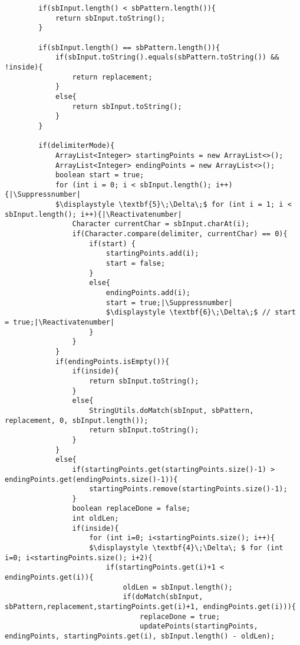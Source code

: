 \documentclass{article}
\makeatletter
\let\origthelstnumber\thelstnumber
\newcommand*\Suppressnumber{%
  \lst@AddToHook{OnNewLine}{%
    \let\thelstnumber\relax%
     \advance\c@lstnumber-\@ne\relax%
    }%
}
\newcommand*\Reactivatenumber{%
  \lst@AddToHook{OnNewLine}{%
   \let\thelstnumber\origthelstnumber%
   \advance\c@lstnumber\@ne\relax}%
}
\makeatother
\begin{document}
\begin{lstlisting}
        if(sbInput.length() < sbPattern.length()){
            return sbInput.toString();
        }

        if(sbInput.length() == sbPattern.length()){
            if(sbInput.toString().equals(sbPattern.toString()) && !inside){
                return replacement;
            }
            else{
                return sbInput.toString();
            }
        }

        if(delimiterMode){
            ArrayList<Integer> startingPoints = new ArrayList<>();
            ArrayList<Integer> endingPoints = new ArrayList<>();
            boolean start = true;
            for (int i = 0; i < sbInput.length(); i++){|\Suppressnumber|
            $\displaystyle \textbf{5}\;\Delta\;$ for (int i = 1; i < sbInput.length(); i++){|\Reactivatenumber|
                Character currentChar = sbInput.charAt(i);
                if(Character.compare(delimiter, currentChar) == 0){
                    if(start) {
                        startingPoints.add(i);
                        start = false;
                    }
                    else{
                        endingPoints.add(i);
                        start = true;|\Suppressnumber|
                        $\displaystyle \textbf{6}\;\Delta\;$ // start = true;|\Reactivatenumber|
                    }
                }
            }
            if(endingPoints.isEmpty()){
                if(inside){
                    return sbInput.toString();
                }
                else{
                    StringUtils.doMatch(sbInput, sbPattern, replacement, 0, sbInput.length());
                    return sbInput.toString();
                }
            }
            else{
                if(startingPoints.get(startingPoints.size()-1) > endingPoints.get(endingPoints.size()-1)){
                    startingPoints.remove(startingPoints.size()-1);
                }
                boolean replaceDone = false;
                int oldLen;
                if(inside){
                    for (int i=0; i<startingPoints.size(); i++){
                    $\displaystyle \textbf{4}\;\Delta\; $ for (int i=0; i<startingPoints.size(); i+2){
                        if(startingPoints.get(i)+1 < endingPoints.get(i)){
                            oldLen = sbInput.length();
                            if(doMatch(sbInput, sbPattern,replacement,startingPoints.get(i)+1, endingPoints.get(i))){
                                replaceDone = true;
                                updatePoints(startingPoints, endingPoints, startingPoints.get(i), sbInput.length() - oldLen);

\end{lstlisting}
\end{document}
